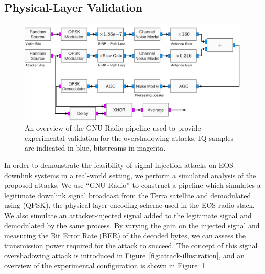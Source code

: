 \subsection{Physical-Layer Validation}\label{sec:physical-layer-validation}

\begin{figure}
    \centering
    \includegraphics[width=\columnwidth]{diagrams/overshadowing_pipeline.pdf}
    \caption{An overview of the GNU Radio pipeline used to provide experimental validation for the overshadowing attacks. IQ samples are indicated in blue, bitstreams in magenta.}
    \label{fig:overshadowing_pipeline}
\end{figure}

In order to demonstrate the feasibility of signal injection attacks on EOS downlink systems in a real-world setting, we perform a simulated analysis of the proposed attacks.
We use ``GNU Radio'' to construct a pipeline which simulates a legitimate downlink signal broadcast from the Terra satellite and demodulated using (QPSK), the physical layer encoding scheme used in the EOS radio stack.
We also simulate an attacker-injected signal added to the legitimate signal and demodulated by the same process.
By varying the gain on the injected signal and measuring the Bit Error Rate (BER) of the decoded bytes, we can assess the transmission power required for the attack to succeed.
The concept of this signal overshadowing attack is introduced in Figure~\ref{fig:attack-illustration}, and an overview of the experimental configuration is shown in Figure~\ref{fig:overshadowing_pipeline}.

